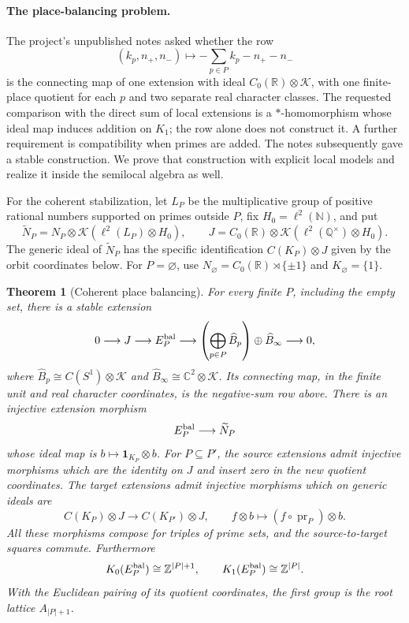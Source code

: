\documentclass[11pt]{article}
\newcommand{\Z}{\mathbb Z}
\newcommand{\Q}{\mathbb Q}
\newcommand{\R}{\mathbb R}
\newcommand{\C}{\mathbb C}
\newcommand{\N}{\mathbb N}
\newcommand{\K}{\mathcal K}
\newcommand{\one}{\mathbf 1}
\newtheorem{theorem}{Theorem}[section]
\theoremstyle{definition}
\theoremstyle{remark}
\begin{document}
\paragraph{The place-balancing problem.}
The project's unpublished notes asked whether the row
\[
 (k_p,n_+,n_-)\longmapsto-\sum_{p\in P}k_p-n_+-n_-
\]
is the connecting map of one extension with ideal $C_0(\R)\otimes\K$, with one finite-place quotient for each $p$ and two separate real character classes. The requested comparison with the direct sum of local extensions is a $*$-homomorphism whose ideal map induces addition on $K_1$; the row alone does not construct it. A further requirement is compatibility when primes are added. The notes subsequently gave a stable construction. We prove that construction with explicit local models and realize it inside the semilocal algebra as well.

For the coherent stabilization, let $L_P$ be the multiplicative group of positive rational numbers supported on primes outside $P$, fix $H_0=\ell^2(\N)$, and put
\[
 \widetilde N_P=N_P\otimes\K(\ell^2(L_P)\otimes H_0),\qquad
 J=C_0(\R)\otimes\K(\ell^2(\Q^\times)\otimes H_0).
\]
The generic ideal of $\widetilde N_P$ has the specific identification $C(K_P)\otimes J$ given by the orbit coordinates below. For $P=\varnothing$, use $N_\varnothing=C_0(\R)\rtimes\{\pm1\}$ and $K_\varnothing=\{1\}$.

\begin{theorem}[Coherent place balancing]\label{thm:stable}
For every finite $P$, including the empty set, there is a stable extension
\[
 0\longrightarrow J\longrightarrow E_P^{\rm bal}
 \longrightarrow\left(\bigoplus_{p\in P}\widehat B_p\right)
                  \oplus\widehat B_\infty\longrightarrow0,
\]
where $\widehat B_p\cong C(S^1)\otimes\K$ and
$\widehat B_\infty\cong\C^2\otimes\K$. Its connecting map, in the finite unit and real character coordinates, is the negative-sum row above. There is an injective extension morphism
\[
 E_P^{\rm bal}\longrightarrow\widetilde N_P
\]
whose ideal map is $b\mapsto\one_{K_P}\otimes b$.
For $P\subseteq P'$, the source extensions admit injective morphisms which are the identity on $J$ and insert zero in the new quotient coordinates. The target extensions admit injective morphisms which on generic ideals are
\[
 C(K_P)\otimes J\longrightarrow C(K_{P'})\otimes J,
 \qquad f\otimes b\longmapsto(f\circ\operatorname{pr}_P)\otimes b.
\]
All these morphisms compose for triples of prime sets, and the source-to-target squares commute. Furthermore
\[
 K_0(E_P^{\rm bal})\cong\Z^{|P|+1},\qquad
 K_1(E_P^{\rm bal})\cong\Z^{|P|}.
\]
With the Euclidean pairing of its quotient coordinates, the first group is the root lattice $A_{|P|+1}$.
\end{theorem}
\end{document}
